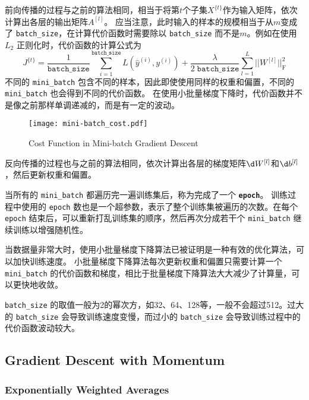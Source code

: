 前向传播的过程与之前的算法相同，相当于将第$t$个子集$X^{\{t\}}$作为输入矩阵，依次计算出各层的输出矩阵$A^{[l]}$。
应当注意，此时输入的样本的规模相当于从$m$变成了 \verb|batch_size|，在计算代价函数时需要除以 \verb|batch_size| 而不是$m$。例如在使用 $L_2$ 正则化时，代价函数的计算公式为
\begin{equation}
    J^{\{t\}} = \frac{1}{\mathtt{batch\_size}}\sum_{i=1}^\mathtt{batch\_size} L(\hat{y}^{(i)}, y^{(i)}) + \frac{\lambda}{2\;\mathtt{batch\_size}}\sum_{l=1}^L||W^{[l]}||_{\mathrm{F}}^2
\end{equation}
不同的 \verb|mini_batch| 包含不同的样本，因此即使使用同样的权重和偏置，不同的 \verb|mini_batch| 也会得到不同的代价函数。
在使用小批量梯度下降时，代价函数并不是像之前那样单调递减的，而是有一定的波动。

\begin{figure}[h!bt]
    \centering
    \texttt{[image: mini-batch\_cost.pdf]}
    \caption{Cost Function in Mini-batch Gradient Descent}
    \label{fig:mini-batch_cost}
\end{figure}

反向传播的过程也与之前的算法相同，依次计算出各层的梯度矩阵$\d W^{[l]}$和$\d b^{[l]}$，然后更新权重和偏置。

当所有的 \verb|mini_batch| 都遍历完一遍训练集后，称为完成了一个 \texttt{\textbf{epoch}}。
训练过程中使用的 \verb|epoch| 数也是一个超参数，表示了整个训练集被遍历的次数。在每个 \verb|epoch| 结束后，可以重新打乱训练集的顺序，然后再次分成若干个 \verb|mini_batch| 继续训练以增强随机性。

当数据量非常大时，使用小批量梯度下降算法已被证明是一种有效的优化算法，可以加快训练速度。
小批量梯度下降算法每次更新权重和偏置只需要计算一个 \verb|mini_batch| 的代价函数和梯度，相比于批量梯度下降算法大大减少了计算量，可以更快地收敛。

\verb|batch_size| 的取值一般为2的幂次方，如32、64、128等，一般不会超过512。过大的 \verb|batch_size| 会导致训练速度变慢，而过小的 \verb|batch_size| 会导致训练过程中的代价函数波动较大。

\subsection{Gradient Descent with Momentum}

\subsubsection{Exponentially Weighted Averages}

